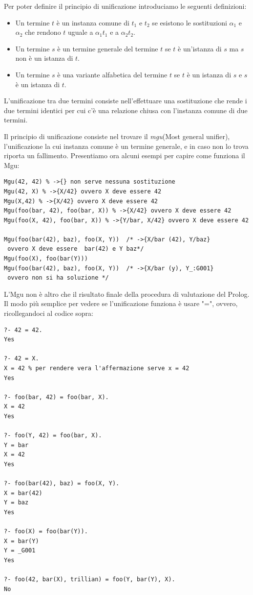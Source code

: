 \documentclass[a4paper]{report}
\begin{document}
Per poter definire il principio di unificazione introduciamo le seguenti definizioni:
\begin{itemize}
  \item Un termine $t$ è un instanza comune  di $t_1$ e $t_2$ se esistono le sostituzioni $\alpha_1$ e $\alpha_2$
        che rendono $t$ uguale a $\alpha_1t_1$ e a $\alpha_2t_2$.
  \item Un termine $s$ è un termine generale del termine $t$ se $t$ è un'istanza di $s$ ma $s$ non è un istanza di $t$.

  \item Un termine $s$ è una variante alfabetica del termine $t$ se $t$ è un istanza di $s$ e $s$ è un istanza di $t$.
\end{itemize}
L'unificazione tra due termini consiste nell'effettuare una sostituzione che rende i due termini identici
per cui c'è una relazione chiusa con l'instanza comune di due termini.

Il principio di unificazione consiste nel trovare il \emph{mgu}(Most general unifier),
l'unificazione la cui instanza comune è un termine generale, e in caso non lo trova riporta un fallimento.
Presentiamo ora alcuni esempi per capire come funziona il Mgu:
\begin{verbatim}
Mgu(42, 42) % ->{} non serve nessuna sostituzione
Mgu(42, X) % ->{X/42} ovvero X deve essere 42
Mgu(X,42) % ->{X/42} ovvero X deve essere 42
Mgu(foo(bar, 42), foo(bar, X)) % ->{X/42} ovvero X deve essere 42
Mgu(foo(X, 42), foo(bar, X)) % ->{Y/bar, X/42} ovvero X deve essere 42

Mgu(foo(bar(42), baz), foo(X, Y))  /* ->{X/bar (42), Y/baz}
 ovvero X deve essere  bar(42) e Y baz*/
Mgu(foo(X), foo(bar(Y))) 
Mgu(foo(bar(42), baz), foo(X, Y))  /* ->{X/bar (y), Y_:G001}
 ovvero non si ha soluzione */
\end{verbatim}
L'Mgu non è altro che il risultato finale della procedura di valutazione del Prolog. Il modo più semplice per vedere se l'unificazione funziona è usare "=", ovvero, ricollegandoci al codice sopra:
\begin{verbatim}
?- 42 = 42.
Yes

?- 42 = X.
X = 42 % per rendere vera l'affermazione serve x = 42
Yes

?- foo(bar, 42) = foo(bar, X).
X = 42
Yes

?- foo(Y, 42) = foo(bar, X).
Y = bar
X = 42
Yes

?- foo(bar(42), baz) = foo(X, Y).
X = bar(42)
Y = baz
Yes

?- foo(X) = foo(bar(Y)).
X = bar(Y)
Y = _G001
Yes

?- foo(42, bar(X), trillian) = foo(Y, bar(Y), X).
No
\end{verbatim}
\end{document}
